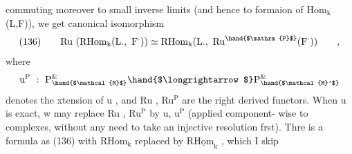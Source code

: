 commuting moreover to small inverse limits (and hence to formaion of
Hom$_{\mathrm{k}}$(L,F)),  we get  canonical isomorphism
\[ \text{(136)}\qquad \mathrm{Ru}\ (\mathrm{RHom}_{\mathrm{k}}(\mathrm{L}.,\ \mathrm{F}^{\cdot})) \simeq \mathrm{RHom}_{\mathrm{k}}(\mathrm{L}.,\ \mathrm{Ru}^{\hand{$\mathrm{P}$}}(\mathrm{F}^{\cdot}))\qquad , \]
where
\[ \mathrm{u}^{\mathrm{P}}\ :\ \mathrm{P}^{\&}_{\hand{$\mathcal{M}$}} \hand{$\longrightarrow$} \mathrm{P}^{\&}_{\hand{$\mathcal{M}'$}} \]
denotes the xtension of u ,  and Ru , Ru$^{\mathrm{P}}$ are the right derived functors.
When u is exact,  w may replace Ru , Ru$^{\mathrm{P}}$  by u, u$^{\mathrm{P}}$  (applied component-%
wise to complexes,  without any need to take an injective resolution
frst).  Thre is a formula as (136)  with RHom$_{\mathrm{k}}$ replaced by $\mathrm{R}\underline{\mathrm{Hom}}_{\mathrm{k}}$ ,
which I skip

